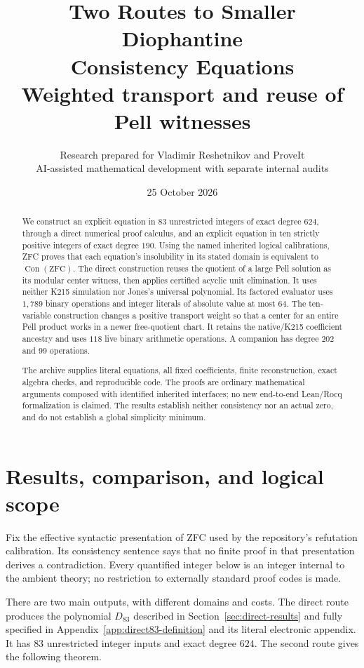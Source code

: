\documentclass[11pt]{article}
\title{\textbf{Two Routes to Smaller Diophantine\\Consistency Equations}\\[6pt]
 \large Weighted transport and reuse of Pell witnesses}
\author{Research prepared for Vladimir Reshetnikov and ProveIt\\
 \small AI-assisted mathematical development with separate internal audits}
\date{25 October 2026}
\theoremstyle{remark}
\newcommand{\Con}{\operatorname{Con}}
\newcommand{\ZFC}{\mathrm{ZFC}}
\newcommand{\DirectVariables}{83}
\newcommand{\DirectDegree}{624}
\begin{document}
\maketitle

\begin{abstract}
We construct an explicit equation in \(\DirectVariables\) unrestricted
integers of exact degree \(\DirectDegree\), through a direct numerical
proof calculus, and an explicit equation in ten strictly positive integers
of exact degree \(190\). Using the named inherited logical calibrations,
ZFC proves that each equation's insolubility in its stated domain is
equivalent to \(\Con(\ZFC)\).
The direct construction reuses the quotient of a large Pell solution as
its modular center witness, then applies certified acyclic unit
elimination. It uses neither K215 simulation nor Jones's universal
polynomial. Its factored evaluator uses \(1{,}789\) binary operations
and integer literals of absolute value at most \(64\).
The ten-variable construction changes a positive transport
weight so that a center for an entire Pell product works in a newer
free-quotient chart. It retains the native/K215 coefficient ancestry and
uses \(118\) live binary arithmetic operations. A companion has degree
\(202\) and \(99\) operations.

The archive supplies literal equations, all fixed coefficients, finite
reconstruction, exact algebra checks, and reproducible code.
The proofs are ordinary mathematical arguments composed with identified
inherited interfaces; no new end-to-end Lean/Rocq formalization is claimed.
The results establish neither consistency nor an actual zero, and do
not establish a global simplicity minimum.
\end{abstract}
\clearpage
\tableofcontents
\newpage

\section{Results, comparison, and logical scope}

Fix the effective syntactic presentation of ZFC used by the repository's
refutation calibration. Its consistency sentence says that no finite proof
in that presentation derives a contradiction. Every quantified integer
below is an integer internal to the ambient theory; no restriction to
externally standard proof codes is made.

There are two main outputs, with different domains and costs.
The direct route produces the polynomial
\(D_{\DirectVariables}\) described in Section~\ref{sec:direct-results} and
fully specified in Appendix~\ref{app:direct83-definition} and its literal
electronic appendix. It has
\(\DirectVariables\) unrestricted integer inputs and exact degree
\(\DirectDegree\). The second route gives the following theorem.
\end{document}
